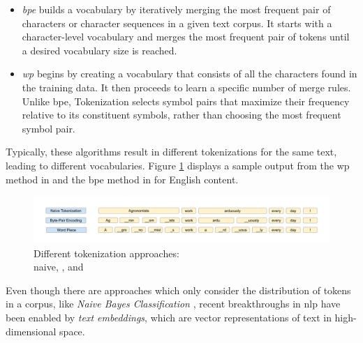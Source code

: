 \begin{itemize}
    \item \emph{\gls{bpe}}  builds a vocabulary by iteratively merging the most frequent pair of characters or character sequences in a given text corpus. It starts with a character-level vocabulary and merges the most frequent pair of tokens until a desired vocabulary size is reached.
    \item \emph{\gls{wp}}  begins by creating a vocabulary that consists of all the characters found in the training data. It then proceeds to learn a specific number of merge rules. Unlike \gls{bpe}, \wordpiece{} Tokenization selects symbol pairs that maximize their frequency relative to its constituent symbols, rather than choosing the most frequent symbol pair.
\end{itemize}

Typically, these algorithms result in different tokenizations for the same text, leading to different vocabularies. Figure \ref{fig:02_tokenizer_comparison} displays a sample output from the \gls{wp} method in  and the \gls{bpe} method in  for English content.


\begin{figure}
    \centering
    \includegraphics[width=\textwidth]{Figures/02/02_Tokenizer_comparison.png}
    \caption{Different tokenization approaches:\\ naive, \bpe{}, and \wordpiece{}}
    \label{fig:02_tokenizer_comparison}
\end{figure}

Even though there are \textclassification{} approaches which only consider the distribution of tokens in a corpus, like \emph{Naive Bayes Classification} , recent breakthroughs in \gls{nlp} have been enabled by \emph{text embeddings}, which are vector representations of text in high-dimensional space. 


